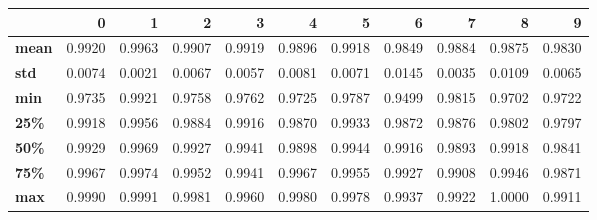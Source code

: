 \begin{tabular}{lrrrrrrrrrr}
\toprule
{} &       0 &       1 &       2 &       3 &       4 &       5 &       6 &       7 &       8 &       9 \\
\midrule
\textbf{mean} &  0.9920 &  0.9963 &  0.9907 &  0.9919 &  0.9896 &  0.9918 &  0.9849 &  0.9884 &  0.9875 &  0.9830 \\
\textbf{std } &  0.0074 &  0.0021 &  0.0067 &  0.0057 &  0.0081 &  0.0071 &  0.0145 &  0.0035 &  0.0109 &  0.0065 \\
\textbf{min } &  0.9735 &  0.9921 &  0.9758 &  0.9762 &  0.9725 &  0.9787 &  0.9499 &  0.9815 &  0.9702 &  0.9722 \\
\textbf{25\% } &  0.9918 &  0.9956 &  0.9884 &  0.9916 &  0.9870 &  0.9933 &  0.9872 &  0.9876 &  0.9802 &  0.9797 \\
\textbf{50\% } &  0.9929 &  0.9969 &  0.9927 &  0.9941 &  0.9898 &  0.9944 &  0.9916 &  0.9893 &  0.9918 &  0.9841 \\
\textbf{75\% } &  0.9967 &  0.9974 &  0.9952 &  0.9941 &  0.9967 &  0.9955 &  0.9927 &  0.9908 &  0.9946 &  0.9871 \\
\textbf{max } &  0.9990 &  0.9991 &  0.9981 &  0.9960 &  0.9980 &  0.9978 &  0.9937 &  0.9922 &  1.0000 &  0.9911 \\
\bottomrule
\end{tabular}

